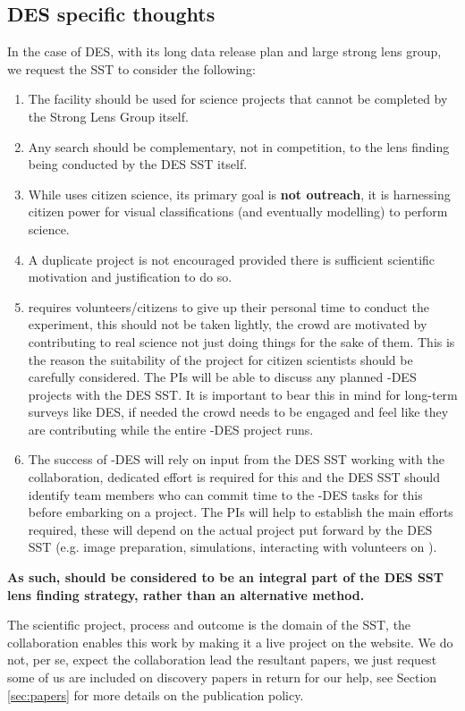 \documentclass[a4paper,twocolumn]{article}
\begin{document}
\subsection{DES specific thoughts}
In the case of DES, with its long data release plan and large strong lens group, we request the SST to consider the following:
\begin{enumerate}
\item The \SW facility should be used for science projects that cannot be completed by the Strong Lens Group itself. 
\item Any \SW search should be complementary, not in competition, to the lens finding being conducted by the DES SST itself.
\item While \SW uses citizen science, its primary goal is \textbf{not outreach}, it is harnessing citizen power for visual classifications (and eventually modelling) to perform science.
\item A duplicate project is not encouraged provided there is sufficient scientific motivation and justification to do so.
\item \SW requires volunteers/citizens to give up their personal time to conduct the experiment, this should not be taken lightly, the crowd are motivated by contributing to real science not just doing things for the sake of them. This is the reason the suitability of the project for citizen scientists should be carefully considered. The \SW PIs will be able to discuss any planned \SW-DES projects with the DES SST. It is important to bear this in mind for long-term surveys like DES, if needed the crowd needs to be engaged and feel like they are contributing while the entire \SW-DES project runs.
\item The success of \SW-DES will rely on input from the DES SST working with the \SW collaboration, dedicated effort is required for this and the DES SST should identify team members who can commit time to the \SW-DES tasks for this before embarking on a project. The \SW PIs will help to establish the main efforts required, these will depend on the actual project put forward by the DES SST (e.g. image preparation, simulations, interacting with volunteers on \Talk).
\end{enumerate}

\textbf{As such, \SW should be considered to be an integral part of the DES SST lens finding strategy, rather than an alternative method.}

The scientific project, process and outcome is the domain of the SST, the \SW collaboration enables this work by making it a live project on the website. We do not, per se, expect the \SW collaboration lead the resultant papers, we just request some of us are included on discovery papers in return for our help, see Section \ref{sec:papers} for more details on the publication policy.
\end{document}
